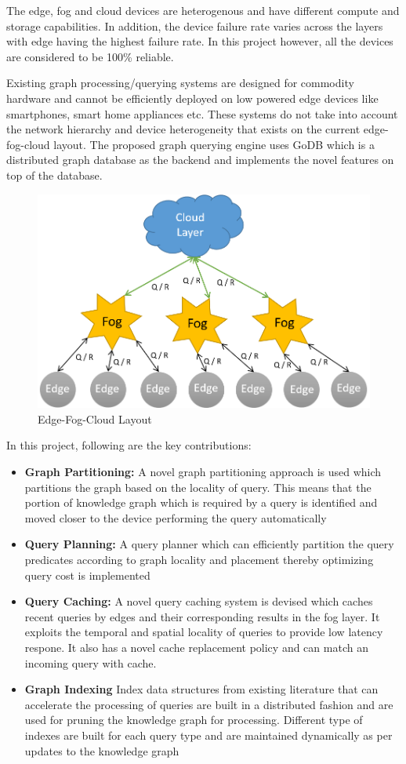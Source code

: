 \documentclass[conference]{IEEEtran}
\begin{document}
The edge, fog and cloud devices are heterogenous and have different compute and storage capabilities. In addition, the device failure rate varies across the layers with edge having the highest failure rate. In this project however, all the devices are considered to be 100\% reliable.

Existing graph processing/querying systems are designed for commodity hardware and cannot be efficiently deployed on low powered edge devices like smartphones, smart home appliances etc. These systems do not take into account the network hierarchy and device heterogeneity that exists on the current edge-fog-cloud layout. The proposed graph querying engine uses GoDB which is a distributed graph database as the backend and implements the novel features on top of the database.

\begin{figure}[!t]
	\centering
	\includegraphics[width=0.75\columnwidth]{1.png}
	\caption{Edge-Fog-Cloud Layout}
	\label{fig:1}
\end{figure}
In this project, following are the key contributions:
\begin{itemize}%
	\item \textbf{Graph Partitioning:} A novel graph partitioning approach is used which partitions the graph based on the locality of query. This means that the portion of knowledge graph which is required by a query is identified and moved closer to the device performing the query automatically 
	\item \textbf{Query Planning:} A query planner which can efficiently partition the query predicates according to graph locality and placement thereby optimizing query cost is implemented
	\item \textbf{Query Caching:} A novel query caching system is devised which caches recent queries by edges and their corresponding results in the fog layer. It exploits the temporal and spatial locality of queries to provide low latency respone. It also has a novel cache replacement policy and can match an incoming query with cache. 
	\item \textbf{Graph Indexing} Index data structures from existing literature that can accelerate the processing of queries are built in a distributed fashion and are used for pruning the knowledge graph for processing. Different type of indexes are built for each query type and are maintained dynamically as per updates to the knowledge graph    
\end{itemize}
\end{document}
